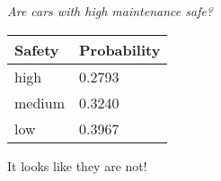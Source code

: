 \begin{center}
    \textit{Are cars with high maintenance safe?}
    \end{center}
\begin{center}
    \begin{tabular}{|l|l|}
        \hline
        \textbf{Safety}&\textbf{Probability}\\
        \hline
        high & 0.2793 \\
        \hline
        medium & 0.3240 \\
        \hline
        low & 0.3967 \\
        \hline
    \end{tabular}
    \end{center}

It looks like they are not!
